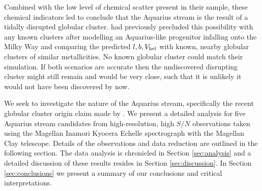 \documentclass{emulateapj}
\begin{document}
Combined with the low level of chemical scatter present in their sample, these chemical indicators led \citet{wylie-de-boer;et-al_2012} to conclude that the Aquarius stream is the result of a tidally disrupted globular cluster. \citet{williams;et-al_2011} had previously precluded this possibility with any known clusters after modelling an Aquarius-like progenitor infalling onto the Milky Way and comparing the predicted $l, b, V_{\rm hel}$ with known, nearby globular clusters of similar metallicities. No known globular cluster could match their simulation. If both scenarios are accurate then the undiscovered disrupting cluster might still remain and would be very close, such that it is unlikely it would not have been discovered by now.

We seek to investigate the nature of the Aquarius stream, specifically the recent globular cluster origin claim made by \citet{wylie-de-boer;et-al_2012}. We present a detailed analysis for five Aquarius stream candidates from high-resolution, high $S/N$ observations taken using the Magellan Inamori Kyocera Echelle spectrograph \citep{bernstein;et-al_2003} with the Magellan Clay telescope. Details of the observations and data reduction are outlined in the following section. The data analysis is chronicled in Section \ref{sec:analysis} and a detailed discussion of these results resides in Section \ref{sec:discussion}. In Section \ref{sec:conclusions} we present a summary of our conclusions and critical interpretations.
\end{document}
